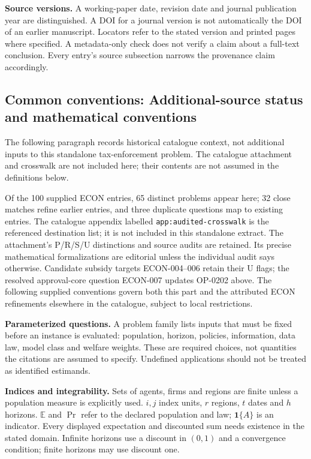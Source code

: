 \documentclass[11pt,a4paper]{article}
\begin{document}
\textbf{Source versions.} A working-paper date, revision date and journal publication year are distinguished. A DOI for a journal version is not automatically the DOI of an earlier manuscript. Locators refer to the stated version and printed pages where specified. A metadata-only check does not verify a claim about a full-text conclusion. Every entry's source subsection narrows the provenance claim accordingly.

\subsection*{Common conventions: Additional-source status and mathematical conventions}

\label{audited:conventions}

The following paragraph records historical catalogue context, not additional inputs to this standalone tax-enforcement problem. The catalogue attachment and crosswalk are not included here; their contents are not assumed in the definitions below.

Of the 100 supplied ECON entries, 65 distinct problems appear here; 32 close
matches refine earlier entries, and three duplicate questions map to existing
entries. The catalogue appendix labelled \texttt{app:audited-crosswalk} is the referenced destination list; it is not included in this standalone extract.
The attachment's P/R/S/U distinctions and source audits are retained. Its
precise mathematical formalizations are editorial unless the individual audit
says otherwise. Candidate subsidy targets ECON-004--006 retain their U flags;
the resolved approval-core question ECON-007 updates OP-0202 above.
The following supplied conventions govern both this part and the attributed
ECON refinements elsewhere in the catalogue, subject to local restrictions.

\textbf{Parameterized questions.} A problem family lists inputs that must be fixed before an instance is evaluated: population, horizon, policies, information, data law, model class and welfare weights. These are required choices, not quantities the citations are assumed to specify. Undefined applications should not be treated as identified estimands.

\textbf{Indices and integrability.} Sets of agents, firms and regions are finite unless a population measure is explicitly used. \(i,j\) index units, \(r\) regions, \(t\) dates and \(h\) horizons. \(\mathbb E\) and \(\Pr\) refer to the declared population and law; \(\mathbf1\{A\}\) is an indicator. Every displayed expectation and discounted sum needs existence in the stated domain. Infinite horizons use a discount in \((0,1)\) and a convergence condition; finite horizons may use discount one.
\end{document}

